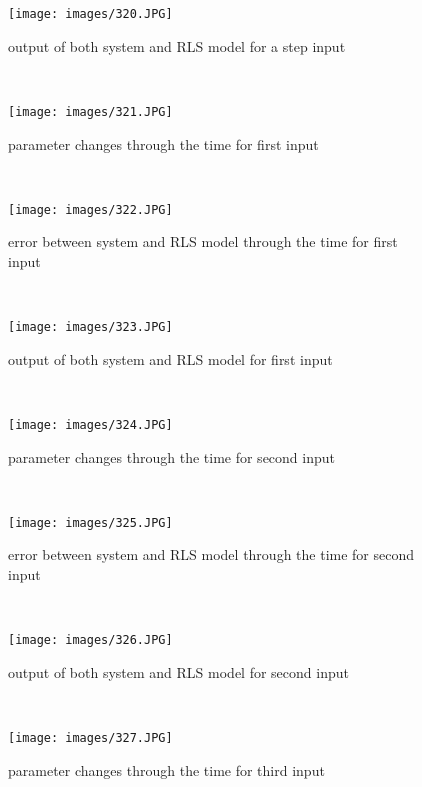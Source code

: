 \documentclass[11pt]{scrartcl} %
\begin{document}
\begin{figure}[H]
	\centering
	\texttt{[image: images/320.JPG]}
	\caption{output of both system and RLS model for a step input}
\end{figure}\\

\begin{figure}[H]
	\centering
	\texttt{[image: images/321.JPG]}
	\caption{parameter changes through the time for first input}
\end{figure}\\

\begin{figure}[H]
	\centering
	\texttt{[image: images/322.JPG]}
	\caption{error between system and RLS model through the time for first input}
\end{figure}\\

\begin{figure}[H]
	\centering
	\texttt{[image: images/323.JPG]}
	\caption{output of both system and RLS model for first input}
\end{figure}\\

\begin{figure}[H]
	\centering
	\texttt{[image: images/324.JPG]}
	\caption{parameter changes through the time for second input}
\end{figure}\\

\begin{figure}[H]
	\centering
	\texttt{[image: images/325.JPG]}
	\caption{error between system and RLS model through the time for second input}
\end{figure}\\

\begin{figure}[H]
	\centering
	\texttt{[image: images/326.JPG]}
	\caption{output of both system and RLS model for second input}
\end{figure}\\

\begin{figure}[H]
	\centering
	\texttt{[image: images/327.JPG]}
	\caption{parameter changes through the time for third input}
\end{figure}\\
\end{document}
